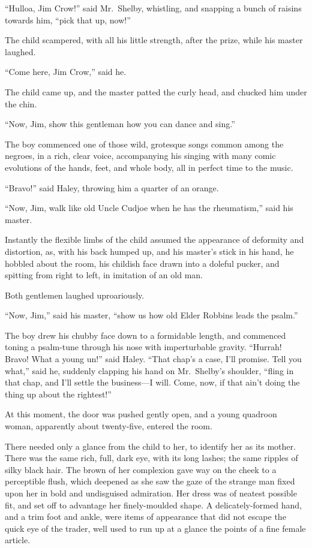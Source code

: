 ``Hulloa, Jim Crow!'' said Mr.\ Shelby, whistling, and snapping a bunch of
raisins towards him, ``pick that up, now!''

The child scampered, with all his little strength, after the prize, while his
master laughed.

``Come here, Jim Crow,'' said he.

The child came up, and the master patted the curly head, and chucked him under
the chin.

``Now, Jim, show this gentleman how you can dance and sing.''

The boy commenced one of those wild, grotesque songs common among the negroes,
in a rich, clear voice, accompanying his singing with many comic evolutions of
the hands, feet, and whole body, all in perfect time to the music.

``Bravo!'' said Haley, throwing him a quarter of an orange.

``Now, Jim, walk like old Uncle Cudjoe when he has the rheumatism,'' said his
master.

Instantly the flexible limbs of the child assumed the appearance of deformity
and distortion, as, with his back humped up, and his master's stick in his hand,
he hobbled about the room, his childish face drawn into a doleful pucker, and
spitting from right to left, in imitation of an old man.

Both gentlemen laughed uproariously.

``Now, Jim,'' said his master, ``show us how old Elder Robbins leads the
psalm.''

The boy drew his chubby face down to a formidable length, and commenced toning a
psalm-tune through his nose with imperturbable gravity. ``Hurrah! Bravo! What a
young un!'' said Haley. ``That chap's a case, I'll promise. Tell you what,''
said he, suddenly clapping his hand on Mr.\ Shelby's shoulder, ``fling in that
chap, and I'll settle the business---I will. Come, now, if that ain't doing the
thing up about the rightest!''

At this moment, the door was pushed gently open, and a young quadroon woman,
apparently about twenty-five, entered the room.

There needed only a glance from the child to her, to identify her as its mother.
There was the same rich, full, dark eye, with its long lashes; the same ripples
of silky black hair. The brown of her complexion gave way on the cheek to a
perceptible flush, which deepened as she saw the gaze of the strange man fixed
upon her in bold and undisguised admiration. Her dress was of neatest possible
fit, and set off to advantage her finely-moulded shape. A delicately-formed
hand, and a trim foot and ankle, were items of appearance that did not escape
the quick eye of the trader, well used to run up at a glance the points of a
fine female article.


